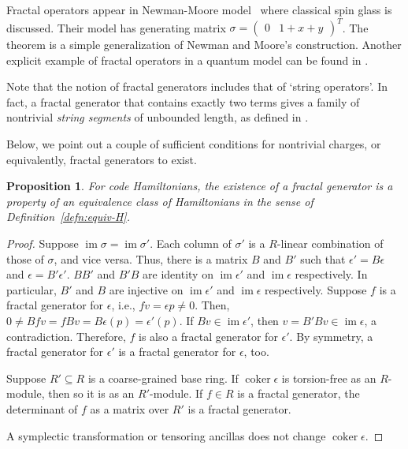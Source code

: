 \documentclass[letterpaper,12pt]{amsart}
\newtheorem{prop}[lem]{Proposition}
\theoremstyle{definition} \newtheorem{defn}{Definition}
\theoremstyle{definition} \newtheorem{rem}{Remark}
\theoremstyle{definition} \newtheorem{example}{Example}
\newcommand{\im}{\mathop{\mathrm{im}}}
\newcommand{\coker}{\mathop{\mathrm{coker}}}
\begin{document}
Fractal operators appear in Newman-Moore model~\cite{NewmanMoore1999Glassy} where classical spin glass is discussed.
Their model has generating matrix $\sigma = \begin{pmatrix} 0 & 1+x+y \end{pmatrix}^T$.
The theorem is a simple generalization of Newman and Moore's construction.
Another explicit example of fractal operators in a quantum model can be found in \cite{BravyiHaah2011Energy}.

Note that the notion of fractal generators includes that of `string operators'.
In fact, a fractal generator that contains exactly two terms
gives a family of nontrivial {\em string segments} of unbounded length,
as defined in \cite{Haah2011Local}.


Below, we point out a couple of sufficient conditions 
for nontrivial charges, or equivalently, fractal generators to exist.
\begin{prop}
For code Hamiltonians,
the existence of a fractal generator is a property of an equivalence class of Hamiltonians
in the sense of Definition~\ref{defn:equiv-H}.
\label{prop:fractal-property-of-eq-class}
\end{prop}
\begin{proof}
Suppose $\im \sigma = \im \sigma'$.
Each column of $\sigma'$ is a $R$-linear combination of those of $\sigma$, and vice versa.
Thus, there is a matrix $B$ and $B'$ such that $\epsilon' = B\epsilon$ and $\epsilon = B' \epsilon'$.
$BB'$ and $B'B$ are identity on $\im \epsilon'$ and $\im \epsilon$ respectively.
In particular, $B'$ and $B$ are injective on $\im \epsilon'$ and $\im \epsilon$ respectively.
Suppose $f$ is a fractal generator for $\epsilon$, i.e., $fv = \epsilon p \ne 0$.
Then, $0 \ne Bfv = f B v = B\epsilon(p) = \epsilon'(p)$.
If $Bv \in \im \epsilon'$, then $v = B'Bv \in \im \epsilon$, a contradiction.
Therefore, $f$ is also a fractal generator for $\epsilon'$.
By symmetry, a fractal generator for $\epsilon'$ is a fractal generator for $\epsilon$, too.

Suppose $R' \subseteq R$ is a coarse-grained base ring.
If $\coker \epsilon$ is torsion-free as an $R$-module,
then so it is as an $R'$-module.
If $f \in R$ is a fractal generator,
the determinant of $f$ as a matrix over $R'$ is a fractal generator.

A symplectic transformation or tensoring ancillas
does not change $\coker \epsilon$.
\end{proof}
\end{document}
